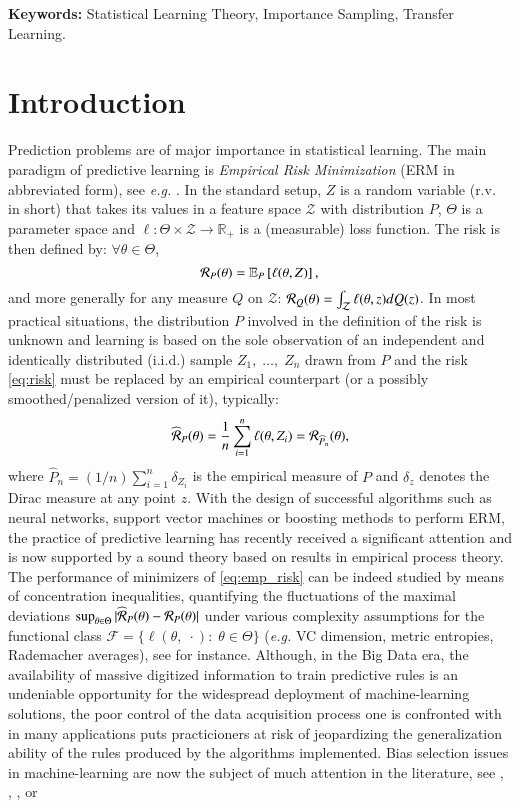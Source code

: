 \documentclass[12pt]{article}
\newcommand{\cR}{{\cal R}}
\begin{document}
\bigskip \noindent
\textbf{Keywords:} 
Statistical Learning Theory, Importance Sampling, Transfer Learning.
 
\section{Introduction}

Prediction problems are of major importance in statistical learning. The main paradigm of predictive learning is \textit{Empirical Risk Minimization} (ERM in abbreviated form), see \textit{e.g.} \cite{Dev1}. In the standard setup, $Z$ is a random variable (r.v. in short) that takes its values in a feature space $\mathcal{Z}$ with distribution $P$, $\Theta$ is a parameter space and $\ell:\Theta \times \mathcal{Z}\rightarrow \mathbb{R}_+$ is a (measurable) loss function. The risk is then defined by: $\forall \theta\in \Theta$,
\begin{equation}\label{eq:risk}
\cR_P(\theta)=\mathbb{E}_P\left[ \ell(\theta, Z) \right],
\end{equation}
and more generally for any measure $Q$ on $\mathcal{Z}$: $\cR_Q(\theta)=\int_\mathcal{Z} \ell (\theta, z) dQ(z)$.
In most practical situations, the distribution $P$ involved in the definition of the risk is unknown and learning is based on the sole observation of an independent and identically distributed (i.i.d.) sample $Z_1,\; \ldots,\; Z_n$ drawn from $P$ and the risk \eqref{eq:risk} must be replaced by an empirical counterpart (or a possibly smoothed/penalized version of it), typically:
\begin{equation}\label{eq:emp_risk}
\widehat{\cR}_P(\theta)=\frac{1}{n}\sum_{i=1}^n \ell(\theta, Z_i)=\cR_{\widehat{P}_n}(\theta),
\end{equation}
where $\widehat{P}_n=(1/n)\sum_{i=1}^n\delta_{Z_i}$ is the empirical measure of $P$ and $\delta_z$ denotes the Dirac measure at any point $z$. With the design of successful algorithms such as neural networks, support vector machines or boosting methods to perform ERM,  the practice of predictive learning has recently received a significant attention and is now supported by a sound theory based on results in empirical process theory. The performance of minimizers of \eqref{eq:emp_risk} can be indeed studied by means of concentration inequalities, quantifying the fluctuations of the maximal deviations $\sup_{\theta\in \Theta}\vert \widehat{\cR}_P(\theta)- \cR_P(\theta) \vert$ under various complexity assumptions for the functional class $\mathcal{F}=\{\ell(\theta,\; \cdot):\; \theta\in \Theta\}$ (\textit{e.g.} {\sc VC} dimension, metric entropies, Rademacher averages), see \cite{boucheron2013concentration} for instance. Although, in the Big Data era, the availability of massive digitized information to train predictive rules is an undeniable opportunity for the widespread deployment of machine-learning solutions, the poor control of the data acquisition process one is confronted with in many applications puts practicioners at risk of jeopardizing the generalization ability of the rules produced by the algorithms implemented. Bias selection issues in machine-learning are now the subject of much attention in the literature, see  \cite{BCZSK16}, \cite{ZWYOC17}, \cite{BHSDR19}, \cite{Liu2016TransferLB} or
\end{document}

